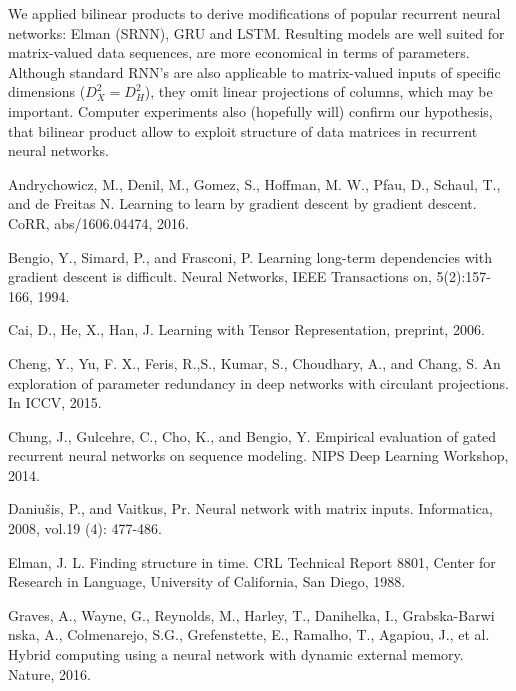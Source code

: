 \documentclass[a4paper,11pt]{article}
\begin{document}
We applied bilinear products to derive modifications of popular recurrent neural networks: Elman (SRNN), GRU and LSTM. Resulting models are well suited for matrix-valued data sequences, are more economical in terms of parameters. Although standard RNN's are also applicable to matrix-valued inputs of specific dimensions ($D_{X}^{2} = D_{H}^{2}$), they omit linear projections of columns, which may be important. Computer experiments also (hopefully will) confirm our hypothesis, that bilinear product allow to exploit structure of data matrices in recurrent neural networks.


 




\begin{thebibliography}{1}



 Andrychowicz, M.,  Denil, M., Gomez, S., Hoffman, M. W., Pfau, D., Schaul, T., and de Freitas N.  Learning to learn by gradient descent by gradient descent. CoRR, abs/1606.04474, 2016.

 Bengio,  Y.,  Simard,  P.,  and  Frasconi, P. Learning long-term dependencies with gradient descent is difficult. Neural Networks, IEEE Transactions on, 5(2):157-166, 1994.


 Cai, D., He, X., Han, J. Learning with Tensor Representation, preprint, 2006.

 Cheng, Y., Yu, F. X., Feris, R.,S., Kumar, S., Choudhary, A., and Chang, S.  An exploration of parameter redundancy in deep networks with circulant projections. In
ICCV, 2015.


 Chung, J., Gulcehre, C., Cho, K., and Bengio, Y. Empirical evaluation of gated recurrent neural networks on sequence modeling. NIPS Deep Learning Workshop, 2014.

 Daniu\v{s}is, P., and Vaitkus, Pr. Neural network with matrix inputs. Informatica, 2008, vol.19 (4): 477-486.


 Elman, J. L. Finding structure in time.  CRL Technical Report 8801, Center for Research in Language, University
of California, San Diego, 1988.

  Graves, A., Wayne, G., Reynolds, M.,  Harley, T., Danihelka, I., Grabska-Barwi
 nska, A., Colmenarejo, S.G., Grefenstette, E., Ramalho, T., Agapiou, J., et al. Hybrid computing using a neural network with dynamic external memory. Nature, 2016.
 



\end{thebibliography}
\end{document}
